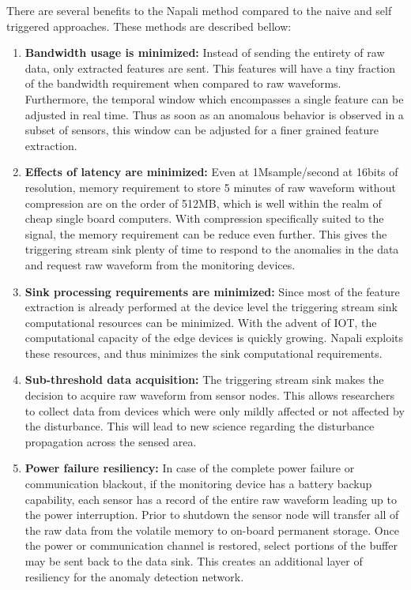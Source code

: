 There are several benefits to the Napali method compared to the naive and self triggered approaches. These methods are described bellow:
\begin{enumerate}
	\item \textbf{Bandwidth usage is minimized:} Instead of sending the entirety of raw data, only extracted features are sent. This features will have a tiny fraction of the bandwidth requirement when compared to raw waveforms. Furthermore, the temporal window which encompasses a single feature can be adjusted in real time. Thus as soon as an anomalous behavior is observed in a subset of sensors, this window can be adjusted for a finer grained feature extraction.
	\item \textbf{Effects of latency are minimized:} Even at 1Msample/second at 16bits of resolution, memory requirement to store 5 minutes of raw waveform without compression are on the order of 512MB, which is well within the realm of cheap single board computers. With compression specifically suited to the signal, the memory requirement can be reduce even further. This gives the triggering stream sink plenty of time to respond to the anomalies in the data and request raw waveform from the monitoring devices.
	\item \textbf{Sink processing requirements are minimized:} Since most of the feature extraction is already performed at the device level the triggering stream sink computational resources can be minimized. With the advent of IOT, the computational capacity of the edge devices is quickly growing. Napali exploits these resources, and thus minimizes the sink computational requirements.
	\item \textbf{Sub-threshold data acquisition:} The triggering stream sink makes the decision to acquire raw waveform from sensor nodes. This allows researchers to collect data from devices which were only mildly affected or not affected by the disturbance. This will lead to new science regarding the disturbance propagation across the sensed area.
	\item \textbf{Power failure resiliency:} In case of the complete power failure or communication blackout, if the monitoring device has a battery backup capability, each sensor has a record of the entire raw waveform leading up to the power interruption. Prior to shutdown the sensor node will transfer all of the raw data from the volatile memory to on-board permanent storage. Once the power or communication channel is restored, select portions of the buffer may be sent back to the data sink. This creates an additional layer of resiliency for the anomaly detection network.

\end{enumerate}

